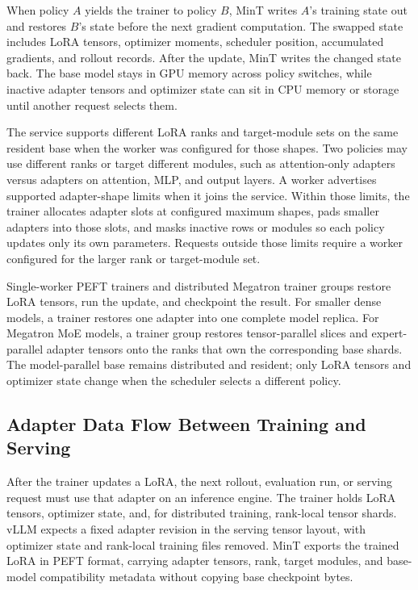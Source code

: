 When policy $A$ yields the trainer to policy $B$, MinT writes $A$'s training state out and restores $B$'s state before the next gradient computation. The swapped state includes LoRA tensors, optimizer moments, scheduler position, accumulated gradients, and rollout records. After the update, MinT writes the changed state back. The base model stays in GPU memory across policy switches, while inactive adapter tensors and optimizer state can sit in CPU memory or storage until another request selects them.

The service supports different LoRA ranks and target-module sets on the same resident base when the worker was configured for those shapes. Two policies may use different ranks or target different modules, such as attention-only adapters versus adapters on attention, MLP, and output layers. A worker advertises supported adapter-shape limits when it joins the service. Within those limits, the trainer allocates adapter slots at configured maximum shapes, pads smaller adapters into those slots, and masks inactive rows or modules so each policy updates only its own parameters. Requests outside those limits require a worker configured for the larger rank or target-module set.

Single-worker PEFT trainers and distributed Megatron trainer groups restore LoRA tensors, run the update, and checkpoint the result. For smaller dense models, a trainer restores one adapter into one complete model replica. For Megatron MoE models, a trainer group restores tensor-parallel slices and expert-parallel adapter tensors onto the ranks that own the corresponding base shards. The model-parallel base remains distributed and resident; only LoRA tensors and optimizer state change when the scheduler selects a different policy.

\subsection{Adapter Data Flow Between Training and Serving}

After the trainer updates a LoRA, the next rollout, evaluation run, or serving request must use that adapter on an inference engine. The trainer holds LoRA tensors, optimizer state, and, for distributed training, rank-local tensor shards. vLLM expects a fixed adapter revision in the serving tensor layout, with optimizer state and rank-local training files removed. MinT exports the trained LoRA in PEFT format, carrying adapter tensors, rank, target modules, and base-model compatibility metadata without copying base checkpoint bytes.

